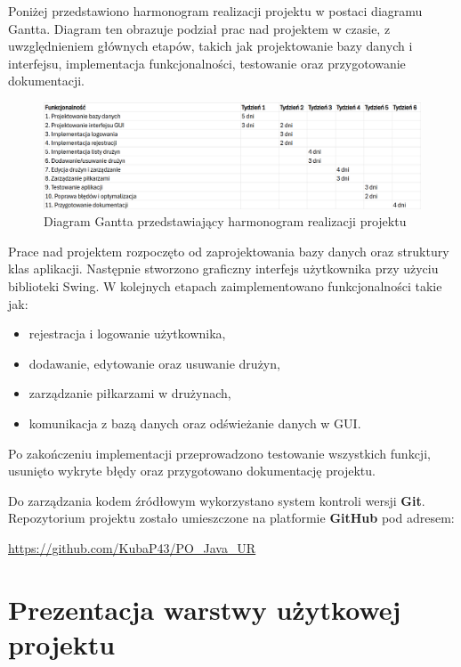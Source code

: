 \documentclass{urdpl}     %
\begin{document}
Poniżej przedstawiono harmonogram realizacji projektu w postaci diagramu Gantta. Diagram ten obrazuje podział prac nad projektem w czasie, z uwzględnieniem głównych etapów, takich jak projektowanie bazy danych i interfejsu, implementacja funkcjonalności, testowanie oraz przygotowanie dokumentacji.

\begin{figure}[H]
    \centering
    \includegraphics[width=\textwidth]{diagram.png}
    \caption{Diagram Gantta przedstawiający harmonogram realizacji projektu}
\end{figure}

Prace nad projektem rozpoczęto od zaprojektowania bazy danych oraz struktury klas aplikacji. Następnie stworzono graficzny interfejs użytkownika przy użyciu biblioteki Swing. W kolejnych etapach zaimplementowano funkcjonalności takie jak:
\begin{itemize}
    \item rejestracja i logowanie użytkownika,
    \item dodawanie, edytowanie oraz usuwanie drużyn,
    \item zarządzanie piłkarzami w drużynach,
    \item komunikacja z bazą danych oraz odświeżanie danych w GUI.
\end{itemize}

Po zakończeniu implementacji przeprowadzono testowanie wszystkich funkcji, usunięto wykryte błędy oraz przygotowano dokumentację projektu.

Do zarządzania kodem źródłowym wykorzystano system kontroli wersji \textbf{Git}. Repozytorium projektu zostało umieszczone na platformie \textbf{GitHub} pod adresem:

\begin{center}
\hypersetup{
    colorlinks=true,
    linkcolor=black,
    urlcolor=black
}
    \url{https://github.com/KubaP43/PO_Java_UR}
\end{center}

\chapter{Prezentacja warstwy użytkowej projektu}\label{4}
\end{document}
